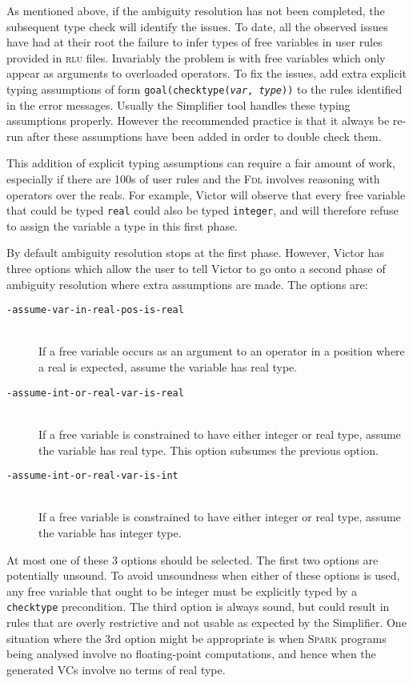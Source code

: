 \documentclass[12pt,fleqn]{article}
\newcommand{\spark}{\textsc{Spark}}
\newcommand{\fdl}{\textsc{Fdl}}
\newcommand{\rlu}{\textsc{rlu}}
\newcommand{\optionb}[1]{\item[\texttt{-{#1}}]\ \\}
\begin{document}
As mentioned above, if the ambiguity resolution has not been completed,
the subsequent type check will identify the issues.  To date, all the
observed issues have had at their root the failure to infer types of
free variables in user rules provided in \rlu{} files.  Invariably
the problem is with free variables which only appear as arguments to
overloaded operators.  To fix the issues, add extra explicit typing
assumptions of form \texttt{goal(checktype(\emph{var}, \emph{type}))}
to the rules identified in the error messages.  Usually the Simplifier
tool handles these typing assumptions properly.  However the
recommended practice is that it always be re-run after these
assumptions have been added in order to double check them.

This addition of explicit typing assumptions can require a fair amount
of work, especially if there are 100s of user rules and the \fdl{}
involves reasoning with operators over the reals.  For example, Victor
will observe that every free variable that could be typed
\texttt{real} could also be typed \texttt{integer}, and will therefore
refuse to assign the variable a type in this first phase.

By default ambiguity resolution stops at the first phase.  However,
Victor has three options which allow the user to tell Victor to go
onto a second phase of ambiguity resolution where extra assumptions
are made.  The options are:
\begin{description}
  \optionb{assume-var-in-real-pos-is-real} If a free variable occurs
  as an argument to an operator in a position where a real is
  expected, assume the variable has real type.
%
  \optionb{assume-int-or-real-var-is-real} If a free variable is
  constrained to have either integer or real type, assume the variable
  has real type.  This option subsumes the previous option.
%
  \optionb{assume-int-or-real-var-is-int} If a free variable is
  constrained to have either integer or real type, assume the variable
  has integer type.
\end{description}
%
At most one of these 3 options should be selected.  The first two
options are potentially unsound.  To avoid unsoundness when either of
these options is used, any free variable that ought to be integer must
be explicitly typed by a \texttt{checktype} precondition.  The third
option is always sound, but could result in rules that are overly
restrictive and not usable as expected by the Simplifier.  One
situation where the 3rd option might be appropriate is when \spark{}
programs being analysed involve no floating-point computations, and
hence when the generated VCs involve no terms of real type.
\end{document}
